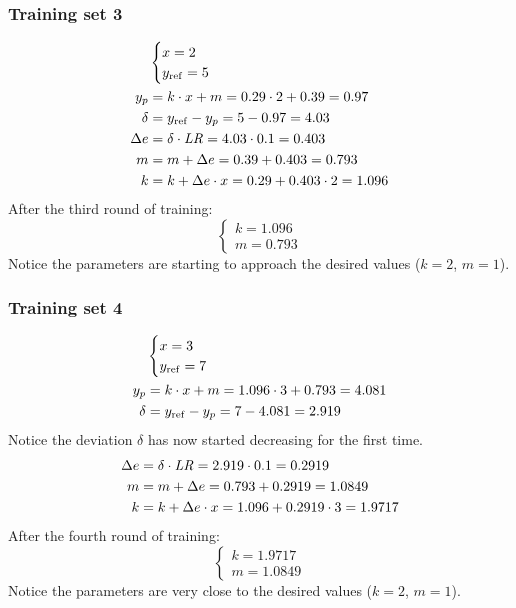 \subsubsection{Training set 3}
\begin{align*}
  &\begin{cases} x = 2 \\ y_{\mathrm{ref}} = 5 \end{cases} \\
  y_{p} &= k \cdot x + m = 0.29 \cdot 2 + 0.39 = 0.97 \\
  \delta &= y_{\mathrm{ref}} - y_{p} = 5 - 0.97 = 4.03 \\
  \Delta e &= \delta \cdot \mathit{LR} = 4.03 \cdot 0.1 = 0.403 \\
  m &= m + \Delta e = 0.39 + 0.403 = 0.793 \\
  k &= k + \Delta e \cdot x = 0.29 + 0.403 \cdot 2 = 1.096
\end{align*}
After the third round of training:
\[
  \begin{cases} k = 1.096 \\ m = 0.793 \end{cases}
\]
Notice the parameters are starting to approach the desired values ($k = 2$, $m = 1$).

\subsubsection{Training set 4}
\begin{align*}
  &\begin{cases} x = 3 \\ y_{\mathrm{ref}} = 7 \end{cases} \\
  y_{p} &= k \cdot x + m = 1.096 \cdot 3 + 0.793 = 4.081 \\
  \delta &= y_{\mathrm{ref}} - y_{p} = 7 - 4.081 = 2.919
\end{align*}
Notice the deviation $\delta$ has now started decreasing for the first time.
\begin{align*}
  \Delta e &= \delta \cdot \mathit{LR} = 2.919 \cdot 0.1 = 0.2919 \\
  m &= m + \Delta e = 0.793 + 0.2919 = 1.0849 \\
  k &= k + \Delta e \cdot x = 1.096 + 0.2919 \cdot 3 = 1.9717
\end{align*}
After the fourth round of training:
\[
  \begin{cases} k = 1.9717 \\ m = 1.0849 \end{cases}
\]
Notice the parameters are very close to the desired values ($k = 2$, $m = 1$).

